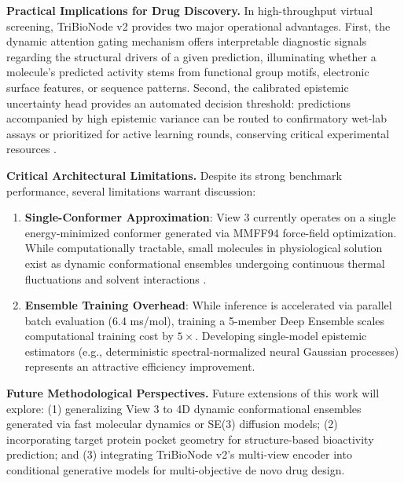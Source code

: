 \documentclass[10pt,twocolumn]{article}
\begin{document}
\noindent\textbf{Practical Implications for Drug Discovery.} In high-throughput virtual screening, TriBioNode v2 provides two major operational advantages. First, the dynamic attention gating mechanism offers interpretable diagnostic signals regarding the structural drivers of a given prediction, illuminating whether a molecule's predicted activity stems from functional group motifs, electronic surface features, or sequence patterns. Second, the calibrated epistemic uncertainty head provides an automated decision threshold: predictions accompanied by high epistemic variance can be routed to confirmatory wet-lab assays or prioritized for active learning rounds, conserving critical experimental resources \cite{soleimany2021image, hirschfeld2020uncertainty}.

\noindent\textbf{Critical Architectural Limitations.} Despite its strong benchmark performance, several limitations warrant discussion:
\begin{enumerate}
    \item \textbf{Single-Conformer Approximation}: View 3 currently operates on a single energy-minimized conformer generated via MMFF94 force-field optimization. While computationally tractable, small molecules in physiological solution exist as dynamic conformational ensembles undergoing continuous thermal fluctuations and solvent interactions \cite{fang2022geometry, liu2022pretraining, zhou2023unimol}.
    \item \textbf{Ensemble Training Overhead}: While inference is accelerated via parallel batch evaluation (6.4 ms/mol), training a 5-member Deep Ensemble scales computational training cost by $5\times$. Developing single-model epistemic estimators (e.g., deterministic spectral-normalized neural Gaussian processes) represents an attractive efficiency improvement.
\end{enumerate}

\noindent\textbf{Future Methodological Perspectives.} Future extensions of this work will explore: (1) generalizing View 3 to 4D dynamic conformational ensembles generated via fast molecular dynamics or SE(3) diffusion models; (2) incorporating target protein pocket geometry for structure-based bioactivity prediction; and (3) integrating TriBioNode v2's multi-view encoder into conditional generative models for multi-objective de novo drug design.

\end{document}

